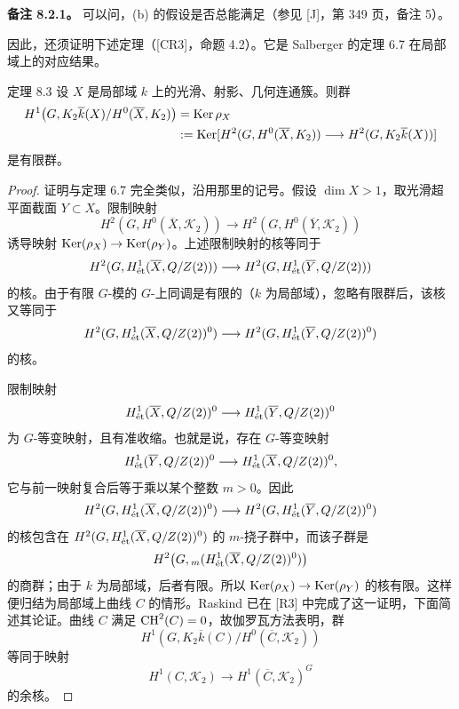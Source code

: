 \noindent\textbf{备注 8.2.1。} 可以问，(b) 的假设是否总能满足（参见 [J]，第 349 页，备注 5）。

因此，还须证明下述定理（[CR3]，命题 4.2）。它是 Salberger 的定理 6.7 在局部域上的对应结果。
\begin{statement}{定理 8.3}
设 $X$ 是局部域 $k$ 上的光滑、射影、几何连通簇。则群
\[
\begin{split}
 H^1\bigl(G,K_2\overline k(X)/H^0(\overline X,K_2)\bigr)
 &=\operatorname{Ker}\rho_X\\
 &:=\operatorname{Ker}[H^2(G,H^0(\overline X,K_2))
 \longrightarrow H^2(G,K_2\overline k(X))]
\end{split}
\]
是有限群。
\end{statement}
\begin{proof}
证明与定理 6.7 完全类似，沿用那里的记号。假设 $\dim X>1$，取光滑超平面截面 $Y\subset X$。限制映射
\[
 H^2(G,H^0(\overline X,\mathcal K_2))
 \longrightarrow H^2(G,H^0(\overline Y,\mathcal K_2))
\]
诱导映射 $\operatorname{Ker}(\rho_X)\to\operatorname{Ker}(\rho_Y)$。上述限制映射的核等同于
\[
 H^2(G,H^1_{\mathrm{\acute et}}(\overline X,Q/Z(2)))
 \longrightarrow H^2(G,H^1_{\mathrm{\acute et}}(\overline Y,Q/Z(2)))
\]
的核。由于有限 $G$-模的 $G$-上同调是有限的（$k$ 为局部域），忽略有限群后，该核又等同于
\[
 H^2(G,H^1_{\mathrm{\acute et}}(\overline X,Q/Z(2))^0)
 \longrightarrow H^2(G,H^1_{\mathrm{\acute et}}(\overline Y,Q/Z(2))^0)
\]
的核。

限制映射
\[
 H^1_{\mathrm{\acute et}}(\overline X,Q/Z(2))^0
 \longrightarrow H^1_{\mathrm{\acute et}}(\overline Y,Q/Z(2))^0
\]
为 $G$-等变映射，且有准收缩。也就是说，存在 $G$-等变映射
\[
 H^1_{\mathrm{\acute et}}(\overline Y,Q/Z(2))^0
 \longrightarrow H^1_{\mathrm{\acute et}}(\overline X,Q/Z(2))^0,
\]
它与前一映射复合后等于乘以某个整数 $m>0$。因此
\[
 H^2(G,H^1_{\mathrm{\acute et}}(\overline X,Q/Z(2))^0)
 \longrightarrow H^2(G,H^1_{\mathrm{\acute et}}(\overline Y,Q/Z(2))^0)
\]
的核包含在 $H^2(G,H^1_{\mathrm{\acute et}}(\overline X,Q/Z(2))^0)$ 的 $m$-挠子群中，而该子群是
\[
 H^2\bigl(G,{}_m(H^1_{\mathrm{\acute et}}(\overline X,Q/Z(2))^0)\bigr)
\]
的商群；由于 $k$ 为局部域，后者有限。所以 $\operatorname{Ker}(\rho_X)\to\operatorname{Ker}(\rho_Y)$ 的核有限。这样便归结为局部域上曲线 $C$ 的情形。Raskind 已在 [R3] 中完成了这一证明，下面简述其论证。曲线 $C$ 满足 $\operatorname{CH}^2(C)=0$，故伽罗瓦方法表明，群
\[
 H^1(G,K_2\overline k(C)/H^0(\overline C,\mathcal K_2))
\]
等同于映射
\[
 H^1(C,\mathcal K_2)\longrightarrow H^1(\overline C,\mathcal K_2)^G
\]
的余核。


\end{proof}
